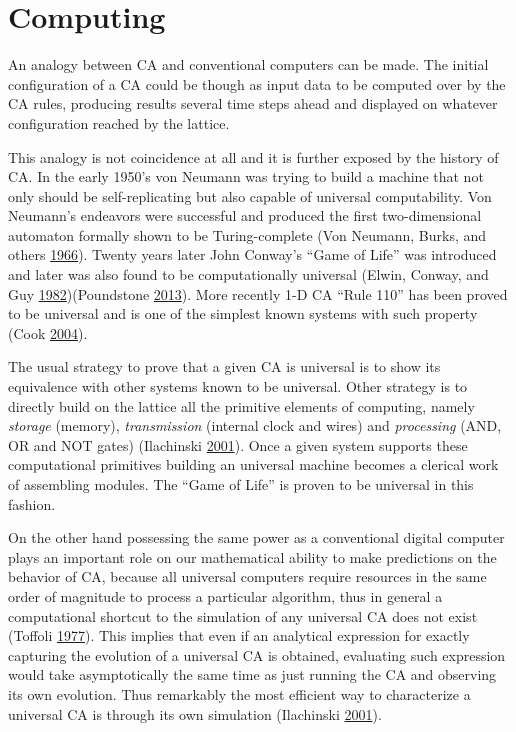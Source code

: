 \documentclass[
]{book}
\begin{document}
\hypertarget{computing}{%
\section{Computing}\label{computing}}

An analogy between CA and conventional computers can be made. The initial configuration of a CA could be though as input data to be computed over by the CA rules, producing results several time steps ahead and displayed on whatever configuration reached by the lattice.

This analogy is not coincidence at all and it is further exposed by the history of CA. In the early 1950's von Neumann was trying to build a machine that not only should be self-replicating but also capable of universal computability. Von Neumann's endeavors were successful and produced the first two-dimensional automaton formally shown to be Turing-complete (Von Neumann, Burks, and others \protect\hyperlink{ref-von1966theory}{1966}). Twenty years later John Conway's ``Game of Life'' was introduced and later was also found to be computationally universal (Elwin, Conway, and Guy \protect\hyperlink{ref-elwin1982winning}{1982})(Poundstone \protect\hyperlink{ref-poundstone2013recursive}{2013}). More recently 1-D CA ``Rule 110'' has been proved to be universal and is one of the simplest known systems with such property (Cook \protect\hyperlink{ref-cook2004universality}{2004}).

The usual strategy to prove that a given CA is universal is to show its equivalence with other systems known to be universal. Other strategy is to directly build on the lattice all the primitive elements of computing, namely \emph{storage} (memory), \emph{transmission} (internal clock and wires) and \emph{processing} (AND, OR and NOT gates) (Ilachinski \protect\hyperlink{ref-ilachinski2001cellular}{2001}). Once a given system supports these computational primitives building an universal machine becomes a clerical work of assembling modules. The ``Game of Life'' is proven to be universal in this fashion.

On the other hand possessing the same power as a conventional digital computer plays an important role on our mathematical ability to make predictions on the behavior of CA, because all universal computers require resources in the same order of magnitude to process a particular algorithm, thus in general a computational shortcut to the simulation of any universal CA does not exist (Toffoli \protect\hyperlink{ref-toffoli1977cellular}{1977}). This implies that even if an analytical expression for exactly capturing the evolution of a universal CA is obtained, evaluating such expression would take asymptotically the same time as just running the CA and observing its own evolution. Thus remarkably the most efficient way to characterize a universal CA is through its own simulation (Ilachinski \protect\hyperlink{ref-ilachinski2001cellular}{2001}).
\end{document}
